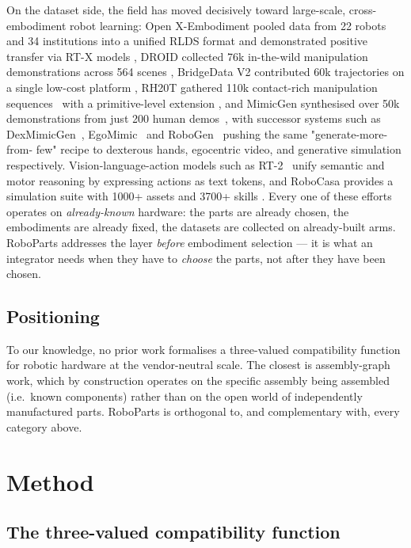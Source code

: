 \documentclass[11pt,twocolumn]{article}
\begin{document}
On the dataset side, the field has moved decisively toward
large-scale, cross-embodiment robot learning: Open X-Embodiment
pooled data from 22 robots and 34 institutions into a unified
RLDS format and demonstrated positive transfer via RT-X models
\cite{OXE2024}, DROID collected 76k in-the-wild manipulation
demonstrations across 564 scenes \cite{DROID2024}, BridgeData V2
contributed 60k trajectories on a single low-cost platform
\cite{BridgeV2}, RH20T gathered 110k contact-rich manipulation
sequences~\cite{RH20T2024} with a primitive-level extension
\cite{RH20TP2024}, and MimicGen synthesised over 50k demonstrations
from just 200 human demos~\cite{MimicGen2023}, with successor systems
such as DexMimicGen~\cite{DexMimicGen2024}, EgoMimic~\cite{EgoMimic2024}
and RoboGen~\cite{RoboGen2023} pushing the same "generate-more-from-
few" recipe to dexterous hands, egocentric video, and generative
simulation respectively. Vision-language-action
models such as RT-2~\cite{RT2_2023} unify semantic and motor
reasoning by expressing actions as text tokens, and RoboCasa provides
a simulation suite with 1000+ assets and 3700+ skills
\cite{RoboCasa2024}. Every one of these efforts operates on
\emph{already-known} hardware: the parts are already chosen, the
embodiments are already fixed, the datasets are collected on
already-built arms. RoboParts addresses the layer \emph{before}
embodiment selection — it is what an integrator needs when they
have to \emph{choose} the parts, not after they have been chosen.

\subsection{Positioning}

To our knowledge, no prior work formalises a three-valued
compatibility function for robotic hardware at the vendor-neutral
scale. The closest is assembly-graph work, which by construction
operates on the specific assembly being assembled (i.e.\ known
components) rather than on the open world of independently
manufactured parts. RoboParts is orthogonal to, and complementary
with, every category above.

\section{Method}

\subsection{The three-valued compatibility function}
\end{document}
